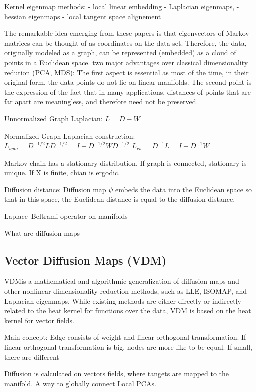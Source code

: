 Kernel eigenmap methods:
- local linear embedding
- Laplacian eigenmaps,
- hessian eigenmaps
- local tangent space alignement

The remarkable idea emerging from these papers is that eigenvectors of Markov matrices can be thought of as coordinates
on the data set. Therefore, the data, originally modeled as a graph, can be represented (embedded) as a cloud of points
in a Euclidean space.
two major advantages over classical dimensionality redution (PCA, MDS):
The first aspect is essential as most of the time, in their original form, the data points do not lie on
 linear manifolds.
 The second point is the expression of the fact that in many
applications, distances of points that are far apart are meaningless, and therefore need not be preserved.

Unnormalized Graph Laplacian:
$L = D - W$

Normalized Graph Laplacian construction:
$L_{sym} = D^{-1/2}LD^{-1/2} = I - D^{-1/2}WD^{-1/2} $
$L_{rw} = D^{-1}L = I - D^{-1}W $

Markov chain has a stationary distribution.
If graph is connected, stationary is unique.
If X is finite, chian is ergodic.

Diffusion distance:
Diffusion map $\psi$ embeds the data into the Euclidean space so that in this space, the Euclidean
distance is equal to the diffusion distance.

Laplace–Beltrami operator on manifolds

What are diffusion maps

\subsection{Vector Diffusion Maps (VDM)}

\cite{vectorDiffusionMaps}
VDMis a mathematical and algorithmic generalization of diffusion maps
and other nonlinear dimensionality reduction methods, such as LLE, ISOMAP,
and Laplacian eigenmaps. While existing methods are either directly or indirectly
related to the heat kernel for functions over the data, VDM is based on
the heat kernel for vector fields.

Main concept:
Edge consists of weight and linear orthogonal transformation.
If linear orthogonal transformation is big, nodes are more like to be equal.
If small, there are different

Diffusion is calculated on vectors fields, where tangets are mapped to the manifold.
A way to globally connect Local PCAs.

